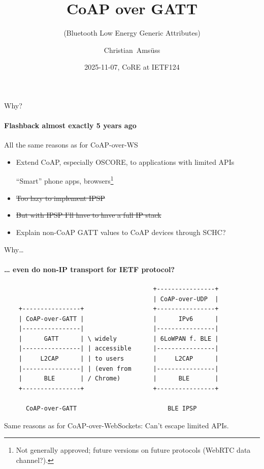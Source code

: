 

\title{CoAP over GATT}
\subtitle{(Bluetooth Low Energy Generic Attributes)\\
}
\author{Christian~Amsüss}
\date{2025-11-07, CoRE at IETF124}



\frame{\titlepage}

\begin{frame}{Why?}
  \framesubtitle{Flashback almost exactly 5 years ago}
  \large
  All the same reasons as for CoAP-over-WS

  \bigskip

  \begin{itemize}
    \item Extend CoAP, especially OSCORE, to applications with limited APIs

      \bigskip

      “Smart” phone apps, browsers\footnote{Not generally approved; future versions on future protocols (WebRTC data channel?).}

      \bigskip

    \item \sout{Too lazy to implement IPSP}

    \bigskip

    \item \sout{But with IPSP I'll have to have a full IP stack}

    \bigskip

    \item Explain non-CoAP GATT values to CoAP devices through SCHC\Huge?

  \end{itemize}
\end{frame}

\begin{frame}[fragile]{Why…}\large
  \framesubtitle{… even do non-IP transport for IETF protocol?}

\vspace{-1cm}
\begin{verbatim}
                                         +----------------+
                                         | CoAP-over-UDP  |
    +----------------+                   +----------------+
    | CoAP-over-GATT |                   |      IPv6      |
    |----------------|                   |----------------|
    |      GATT      | \ widely          | 6LoWPAN f. BLE |
    |----------------| | accessible      |----------------|
    |     L2CAP      | | to users        |     L2CAP      |
    |----------------| | (even from      |----------------|
    |      BLE       | / Chrome)         |      BLE       |
    +----------------+                   +----------------+
    
      CoAP-over-GATT                         BLE IPSP
\end{verbatim}

\large Same reasons as for CoAP-over-WebSockets: Can't escape limited APIs.

\end{frame}

